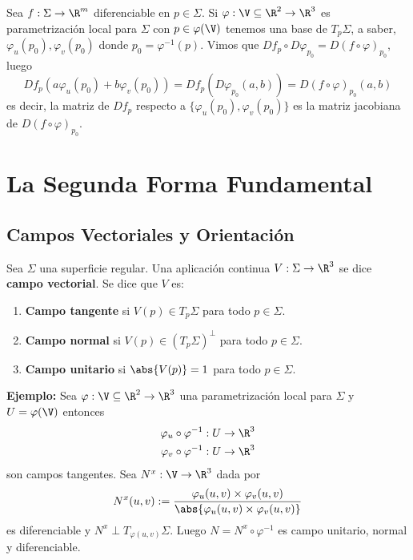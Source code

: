 \documentclass{article}
\begin{document}
\vspace{4mm}
\noindent Sea $f:\Sigma\to\R^{m}$ diferenciable en $p\in\Sigma$. Si $\varphi:\V\subseteq\R^{2}\to\R^{3}$ es
parametrización local para $\Sigma$ con $p\in\varphi(\V)$ tenemos una base de $T_{p}\Sigma$, a 
saber, $\varphi_{u}(p_{0}),\varphi_{v}(p_{0})$ donde $p_{0}=\varphi^{-1}(p)$. Vimos que
$Df_{p}\circ D\varphi_{p_{0}}=D(f\circ\varphi)_{p_{0}}$, luego
\begin{equation*}
    Df_{p}(a\varphi_{u}(p_{0})+b\varphi_{v}(p_{0}))=Df_{p}(D\varphi_{p_{0}}(a,b))=
    D(f\circ\varphi)_{p_{0}}(a,b)
\end{equation*}
es decir, la matriz de $Df_{p}$ respecto a $\{\varphi_{u}(p_{0}),\varphi_{v}(p_{0})\}$ es la matriz
jacobiana de $D(f\circ\varphi)_{p_{0}}$.

\newpage
\section{La Segunda Forma Fundamental}
\subsection{Campos Vectoriales y Orientación}

\begin{dfn}
    Sea $\Sigma$ una superficie regular. Una aplicación continua $V:\Sigma\to\R^{3}$ se dice
    \textbf{campo vectorial}. Se dice que $V$ es:
    \begin{enumerate}
        \item \textbf{Campo tangente} si $V(p)\in T_{p}\Sigma$ para todo $p\in\Sigma$.
        \item \textbf{Campo normal} si $V(p)\in\left(T_{p}\Sigma\right)^{\perp}$ para todo $p\in\Sigma$.
        \item \textbf{Campo unitario} si $\abs{V(p)}=1$ para todo $p\in\Sigma$.
    \end{enumerate}
\end{dfn}

\noindent\textbf{Ejemplo:} Sea $\varphi:\V\subseteq\R^{2}\to\R^{3}$ una parametrización local para
$\Sigma$ y $U=\varphi(\V)$ entonces
\begin{align*}
    \varphi_{u}\circ\varphi^{-1}:U\to\R^{3} \\
    \varphi_{v}\circ\varphi^{-1}:U\to\R^{3}
\end{align*}
son campos tangentes. Sea $N^{x}:\V\to\R^{3}$ dada por
\begin{equation*}
    N^{x}(u,v):=\frac{\varphi_{u}(u,v)\times\varphi_{v}(u,v)}
    {\abs{\varphi_{u}(u,v)\times\varphi_{v}(u,v)}}
\end{equation*}
es diferenciable y $N^{x}\perp T_{\varphi(u,v)}\Sigma$. Luego $N=N^{x}\circ\varphi^{-1}$ es campo
unitario, normal y diferenciable.
\end{document}
